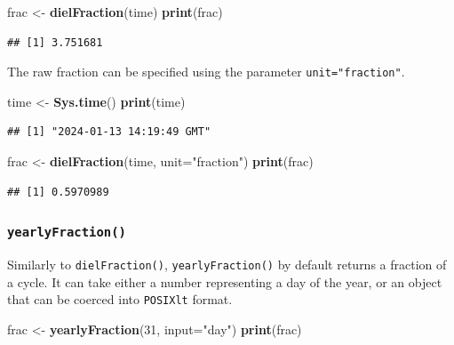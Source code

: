 \documentclass[
]{book}
\newenvironment{Shaded}{\begin{snugshade}}{\end{snugshade}}
\newcommand{\AttributeTok}[1]{\textcolor[rgb]{0.13,0.29,0.53}{#1}}
\newcommand{\DecValTok}[1]{\textcolor[rgb]{0.00,0.00,0.81}{#1}}
\newcommand{\FunctionTok}[1]{\textcolor[rgb]{0.13,0.29,0.53}{\textbf{#1}}}
\newcommand{\NormalTok}[1]{#1}
\newcommand{\OtherTok}[1]{\textcolor[rgb]{0.56,0.35,0.01}{#1}}
\newcommand{\StringTok}[1]{\textcolor[rgb]{0.31,0.60,0.02}{#1}}
\begin{document}
\begin{Shaded}
\begin{Highlighting}[]
\NormalTok{frac }\OtherTok{\textless{}{-}} \FunctionTok{dielFraction}\NormalTok{(time)}
\FunctionTok{print}\NormalTok{(frac)}
\end{Highlighting}
\end{Shaded}

\begin{verbatim}
## [1] 3.751681
\end{verbatim}

The raw fraction can be specified using the parameter \texttt{unit="fraction"}.

\begin{Shaded}
\begin{Highlighting}[]
\NormalTok{time }\OtherTok{\textless{}{-}} \FunctionTok{Sys.time}\NormalTok{()}
\FunctionTok{print}\NormalTok{(time)}
\end{Highlighting}
\end{Shaded}

\begin{verbatim}
## [1] "2024-01-13 14:19:49 GMT"
\end{verbatim}

\begin{Shaded}
\begin{Highlighting}[]
\NormalTok{frac }\OtherTok{\textless{}{-}} \FunctionTok{dielFraction}\NormalTok{(time, }\AttributeTok{unit=}\StringTok{"fraction"}\NormalTok{)}
\FunctionTok{print}\NormalTok{(frac)}
\end{Highlighting}
\end{Shaded}

\begin{verbatim}
## [1] 0.5970989
\end{verbatim}

\hypertarget{yearlyfraction}{%
\subsubsection{\texorpdfstring{\texttt{yearlyFraction()}}{yearlyFraction()}}\label{yearlyfraction}}

Similarly to \texttt{dielFraction()}, \texttt{yearlyFraction()} by default returns a fraction of a cycle. It can take either a number representing a day of the year, or an object that can be coerced into \texttt{POSIXlt} format.

\begin{Shaded}
\begin{Highlighting}[]
\NormalTok{frac }\OtherTok{\textless{}{-}} \FunctionTok{yearlyFraction}\NormalTok{(}\DecValTok{31}\NormalTok{, }\AttributeTok{input=}\StringTok{"day"}\NormalTok{)}
\FunctionTok{print}\NormalTok{(frac)}
\end{Highlighting}
\end{Shaded}
\end{document}
